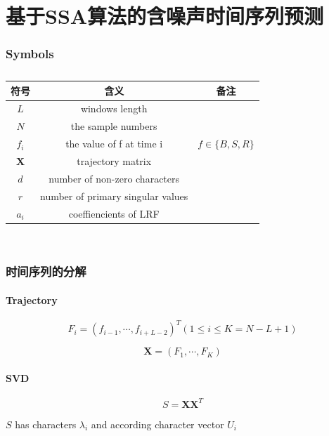 \documentclass[a4paper]{article}
\begin{document}
\part{基于SSA算法的含噪声时间序列预测}
\section*{Symbols}
\begin{table}[H]
	\centering
	\caption{}
	\label{tab:ssa_symbols}
	\begin{tabular}{ccc}
		\hline
		符号 & 含义 & 备注 \\
		\hline
		$L$ & windows length & \\
		$N$ & the sample numbers & \\
		$f_i$ & the value of f at time i & $f \in \{B, S, R\}$ \\
		$\textbf{X}$ & trajectory matrix & \\
		$d$ & number of non-zero characters & \\
		$r$ & number of primary singular values & \\
		$a_i$ & coeffiencients of LRF & \\
		\hline
	\end{tabular} \\
\end{table}
\section{时间序列的分解}
\subsection{Trajectory}
\begin{equation}
	\label{eqn:F_i}
	F_i = (f_{i-1}, \cdots, f_{i+L-2})^T  (1 \leq i \leq K = N - L + 1)
\end{equation}

\begin{equation}
	\label{eqn:X}
	\textbf{X} = (F_1, \cdots, F_K)
\end{equation}

\subsection{SVD}

\begin{equation}
	\label{eqn:S}
	S = \textbf{X} \textbf{X}^T
\end{equation}

$S$ has characters $\lambda_i$ and according character vector $U_i$
\end{document}
